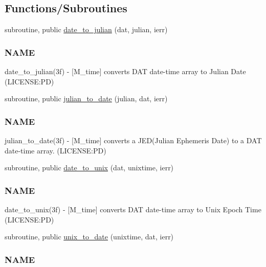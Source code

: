 \subsection*{Functions/\+Subroutines}
\begin{DoxyCompactItemize}
\item 
subroutine, public \mbox{\hyperlink{namespacem__time_acfdc970b4154b0c15bd33727636e3992}{date\+\_\+to\+\_\+julian}} (dat, julian, ierr)
\begin{DoxyCompactList}\small\item\em \subsubsection*{N\+A\+ME}

date\+\_\+to\+\_\+julian(3f) -\/ \mbox{[}M\+\_\+time\mbox{]} converts D\+AT date-\/time array to Julian Date (L\+I\+C\+E\+N\+SE\+:PD) \end{DoxyCompactList}\item 
subroutine, public \mbox{\hyperlink{namespacem__time_abb44cf18cd0a3e420c20469efb056203}{julian\+\_\+to\+\_\+date}} (julian, dat, ierr)
\begin{DoxyCompactList}\small\item\em \subsubsection*{N\+A\+ME}

julian\+\_\+to\+\_\+date(3f) -\/ \mbox{[}M\+\_\+time\mbox{]} converts a J\+E\+D(\+Julian Ephemeris Date) to a D\+AT date-\/time array. (L\+I\+C\+E\+N\+SE\+:PD) \end{DoxyCompactList}\item 
subroutine, public \mbox{\hyperlink{namespacem__time_aed245c691853279ebf0ce899dec9caa9}{date\+\_\+to\+\_\+unix}} (dat, unixtime, ierr)
\begin{DoxyCompactList}\small\item\em \subsubsection*{N\+A\+ME}

date\+\_\+to\+\_\+unix(3f) -\/ \mbox{[}M\+\_\+time\mbox{]} converts D\+AT date-\/time array to Unix Epoch Time (L\+I\+C\+E\+N\+SE\+:PD) \end{DoxyCompactList}\item 
subroutine, public \mbox{\hyperlink{namespacem__time_acc62ada23f8fa2fe67b428702fbcbf1c}{unix\+\_\+to\+\_\+date}} (unixtime, dat, ierr)
\begin{DoxyCompactList}\small\item\em \subsubsection*{N\+A\+ME}


\end{DoxyCompactList}
\end{DoxyCompactItemize}
